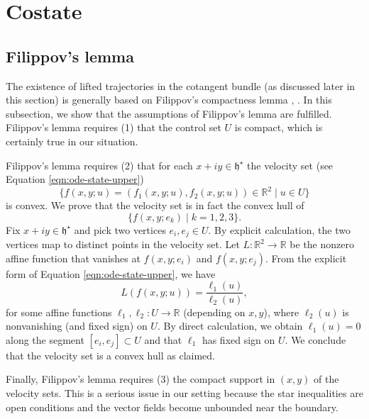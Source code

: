 \documentclass{article}
\theoremstyle{remark}
\newcommand{\ring}[1]{\mathbb{#1}}
\def\h{\mathfrak h}
\def\hstar{{\mathfrak h}^\star}
\begin{document}
\section{Costate}

\subsection{Filippov's lemma}\label{sec:fil}

The existence of lifted trajectories in the cotangent bundle (as
discussed later in this section) is generally based on Filippov's
compactness lemma \cite[Th.10.1]{agrachev2013control},
\cite[\S4.5]{liberzon2012calculus}.  In this subsection, we show that
the assumptions of Filippov's lemma are fulfilled.  Filippov's lemma
requires (1) that the control set $U$ is compact, which is certainly
true in our situation.

Filippov's lemma requires (2) that for each $x+i y\in \hstar$ 
 the velocity set (see Equation
\ref{eqn:ode-state-upper})
\[
\{f(x,y;u)=(f_1(x,y;u),f_2(x,y;u))\in \ring{R}^2\mid u\in U\}
\]
is convex.  We prove that the velocity set is in fact the
convex hull of 
\[
\{ f(x,y;e_k)\mid k=1,2,3\}.
\]
Fix $x+i y\in \hstar$ and pick two vertices $e_i,e_j\in U$.  
By explicit calculation, the two vertices map to distinct points
in the velocity set.
Let $L:\ring{R}^2\to \ring{R}$ be the nonzero affine function that
vanishes at $f(x,y;e_i)$ and $f(x,y;e_j)$.  From the explicit form of
Equation \ref{eqn:ode-state-upper}, we have
\[
L(f(x,y;u)) = \frac{\ell_1( u)}{\ell_2(u)},
\]
for some affine functions $\ell_1,\ell_2:U\to \ring{R}$ (depending on
$x,y$), where $\ell_2(u)$ is nonvanishing (and fixed sign) on $U$.  By
direct calculation,
we obtain $\ell_1(u)=0$ along the segment $[e_i,e_j]\subset U$ and
that $\ell_1$ has fixed sign on $U$.  We conclude that the velocity
set is a  convex hull as claimed.


Finally, Filippov's lemma requires (3) the compact support in
$(x,y)$ of the velocity sets.  This is a serious issue in our setting
because the star inequalities are open conditions and the vector
fields become unbounded near the boundary.  
\end{document}
